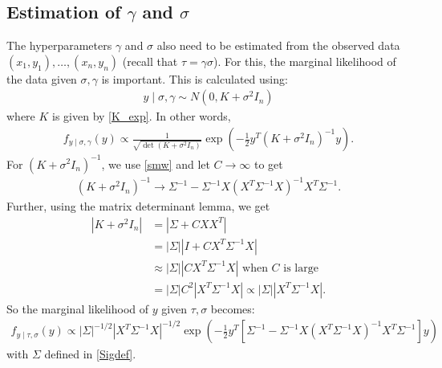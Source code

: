 \documentclass{scrartcl}
\begin{document}
\subsection{Estimation of $\gamma$ and $\sigma$}

The hyperparameters $\gamma$ and $\sigma$ also need to be estimated
from the observed data $(x_1, y_1), \dots, (x_n, y_n)$ (recall that
$\tau = \gamma \sigma$). For this, the marginal likelihood of the data
given $\sigma, \gamma$ is important. This is calculated using: 
\begin{align*}
  y \mid \sigma, \gamma \sim N(0, K + \sigma^2 I_n)
\end{align*}
where $K$  is given by \eqref{K_exp}. In other words,
\begin{align*}
  f_{y \mid \sigma, \gamma}(y) \propto \frac{1}{\sqrt{\det(K +
  \sigma^2 I_n)}} \exp \left(-\frac{1}{2} y^T (K + \sigma^2 I_n)^{-1}
  y \right). 
\end{align*}
For $(K + \sigma^2 I_n)^{-1}$, we use \eqref{smw} and let $C
\rightarrow \infty$ to get 
\begin{align*}
  (K + \sigma^2 I_n)^{-1} \rightarrow \Sigma^{-1} - \Sigma^{-1} X
  \left(X^T \Sigma^{-1} X  \right)^{-1} X^T \Sigma^{-1}.  
\end{align*}
Further, using the matrix determinant lemma, we get
\begin{align*}
  |K + \sigma^2 I_n| &= |\Sigma + C X X^T| \\
                     &= |\Sigma| |I + C X^T \Sigma^{-1} X| \\
                     &\approx |\Sigma| |C X^T \Sigma^{-1} X| \text{ when $C$ is large} \\
  &= |\Sigma| C^2 |X^T \Sigma^{-1} X| \propto |\Sigma| |X^T
    \Sigma^{-1} X|. 
\end{align*}
So the marginal likelihood of $y$ given $\tau, \sigma$ becomes:
\begin{align*}
  f_{y \mid \tau, \sigma}(y) \propto |\Sigma|^{-1/2} |X^T \Sigma^{-1}
  X|^{-1/2} \exp \left(-\frac{1}{2} y^T \left[\Sigma^{-1} -
  \Sigma^{-1} X \left(X^T \Sigma^{-1} X  \right)^{-1} X^T 
  \Sigma^{-1}\right] y  \right)
\end{align*}
with $\Sigma$ defined in \eqref{Sigdef}. 
\end{document}
